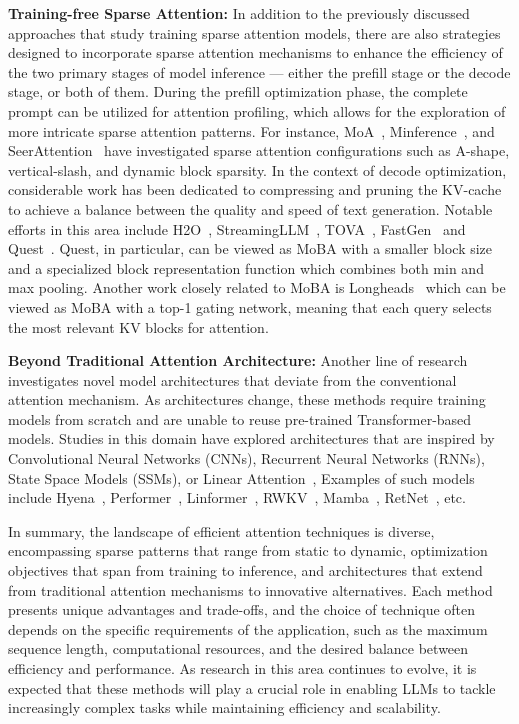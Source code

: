 \textbf{Training-free Sparse Attention:}
In addition to the previously discussed approaches that study training sparse attention models, there are also strategies designed to incorporate sparse attention mechanisms to enhance the efficiency of the two primary stages of model inference --- either the prefill stage or the decode stage, or both of them.
%
During the prefill optimization phase, the complete prompt can be utilized for attention profiling, which allows for the exploration of more intricate sparse attention patterns. For instance, MoA~\citep{fu2024moa}, Minference~\citep{jiang2024minference}, and SeerAttention~\citep{gao2024seerattention} have investigated sparse attention configurations such as A-shape, vertical-slash, and dynamic block sparsity.
%
In the context of decode optimization, considerable work has been dedicated to compressing and pruning the KV-cache to achieve a balance between the quality and speed of text generation. Notable efforts in this area include H2O~\citep{zhang2024h2o}, StreamingLLM~\citep{xiao2023efficient}, TOVA~\citep{oren2024tova}, FastGen~\citep{ge2023fastgen} and  Quest~\citep{tang2024quest}. Quest, in particular, can be viewed as MoBA with a smaller block size and a specialized block representation function which combines both min and max pooling. Another work closely related to MoBA is Longheads~\citep{lu2024longheads} which can be viewed as MoBA with a top-1 gating network, meaning that each query selects the most relevant KV blocks for attention.


\textbf{Beyond Traditional Attention Architecture:} Another line of research  investigates novel model architectures that deviate from the conventional attention mechanism. As architectures change, these methods require training models from scratch and are unable to reuse pre-trained Transformer-based models. 
 Studies in this domain have explored architectures that are inspired by  Convolutional Neural Networks (CNNs), Recurrent Neural Networks (RNNs), State Space Models (SSMs), or Linear Attention~\citep{katharopoulos2020transformers}, Examples of such models include Hyena~\citep{poli2023hyena},  Performer~\citep{choromanski2020rethinking},
Linformer~\citep{wang2020linformer},
RWKV~\cite{peng2023rwkv}, Mamba~\citep{gu2023mamba}, RetNet~\citep{sun2023retentive}, etc.

In summary, the landscape of efficient attention techniques is diverse, encompassing sparse patterns that range from static to dynamic, optimization objectives that span from training to inference, and architectures that extend from traditional attention mechanisms to innovative alternatives.
%
Each method presents unique advantages and trade-offs, and the choice of technique often depends on the specific requirements of the application, such as the maximum sequence length, computational resources, and the desired balance between efficiency and performance. As research in this area continues to evolve, it is expected that these methods will play a crucial role in enabling LLMs to tackle increasingly complex tasks while maintaining efficiency and scalability.
